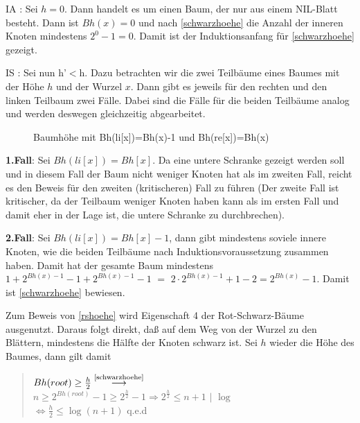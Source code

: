 \begin{beweis} 
 IA : Sei $h=0$. Dann handelt es um einen Baum, der nur aus einem NIL-Blatt besteht. Dann ist $Bh(x)=0$ und nach \autoref{schwarzhoehe} 
 die Anzahl der inneren Knoten mindestens $2^0-1=0$. Damit ist der Induktionsanfang für \autoref{schwarzhoehe} gezeigt. 
 \medskip
 
 \noindent IS : Sei nun h'$<$h. Dazu betrachten wir die zwei Teilbäume eines Baumes mit der Höhe $h$ und der Wurzel $x$.
Dann gibt es jeweils für den rechten und den linken Teilbaum zwei Fälle. Dabei sind die Fälle für die beiden Teilbäume analog und
 werden deswegen gleichzeitig abgearbeitet.

    \begin{figure}[H]
    \centering
    \caption{Baumhöhe mit Bh(li[x])=Bh(x)-1 und Bh(re[x])=Bh(x)}
    \label{241103d}
 \end{figure} 
 
    \textbf{1.Fall}:  Sei $Bh(li[x]) = Bh[x]$. Da eine untere Schranke gezeigt werden soll und in diesem Fall der Baum nicht weniger 
    Knoten
    hat als im zweiten Fall, reicht es den Beweis für den zweiten (kritischeren) Fall zu führen (Der zweite Fall ist kritischer, da
    der Teilbaum weniger Knoten haben kann als im ersten Fall und damit eher in der Lage ist, die untere Schranke zu durchbrechen).
     
    \textbf{2.Fall}:  Sei $Bh(li[x]) = Bh[x]-1$, dann gibt mindestens soviele innere Knoten, wie die beiden
    Teilbäume nach Induktionsvoraussetzung zusammen haben. Damit hat der gesamte Baum mindestens   
    $1+2^{Bh(x)-1}-1+2^{Bh(x)-1}-1$  $=$ $2 \cdot 2^{Bh(x)-1}+1-2 = 2^{Bh(x)}-1$. Damit ist \autoref{schwarzhoehe} bewiesen. 
    
Zum Beweis von \autoref{rshoehe} wird Eigenschaft 4 der Rot-Schwarz-Bäume ausgenutzt. Daraus folgt direkt, daß auf dem Weg von der Wurzel zu den Blättern,
mindestens die Hälfte der Knoten schwarz ist. Sei $h$ wieder die Höhe des Baumes, dann gilt damit 

\begin{quote}       
        $Bh(root) \geq \frac{h}{2}\stackrel{\text{\autoref{schwarzhoehe}}}{\longrightarrow}$\\
        $n \geq 2^{Bh(root)}-1 \geq 2^{\frac{h}{2}}-1 \Rightarrow 2^{\frac{h}{2}}\leq n+1$ \hspace{2cm}$|$ $\log$\\
        $\Leftrightarrow \frac{h}{2}\leq \log(n+1)$  \hfill q.e.d  
\end{quote}
\end{beweis} 

